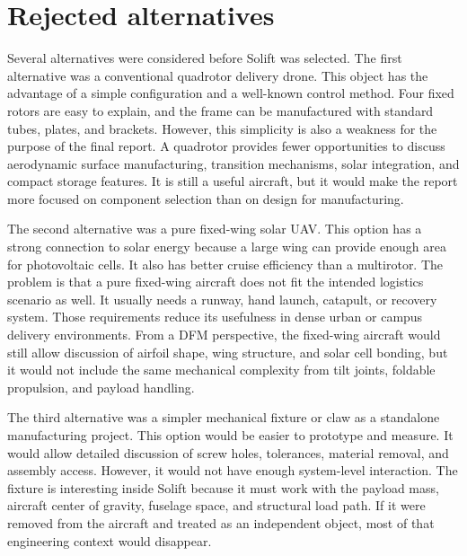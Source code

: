 \section{Rejected alternatives}
\label{subsec:rejected-alternatives}

Several alternatives were considered before Solift was selected. The first alternative was a conventional quadrotor delivery drone. This object has the advantage of a simple configuration and a well-known control method. Four fixed rotors are easy to explain, and the frame can be manufactured with standard tubes, plates, and brackets. However, this simplicity is also a weakness for the purpose of the final report. A quadrotor provides fewer opportunities to discuss aerodynamic surface manufacturing, transition mechanisms, solar integration, and compact storage features. It is still a useful aircraft, but it would make the report more focused on component selection than on design for manufacturing.

The second alternative was a pure fixed-wing solar UAV. This option has a strong connection to solar energy because a large wing can provide enough area for photovoltaic cells. It also has better cruise efficiency than a multirotor. The problem is that a pure fixed-wing aircraft does not fit the intended logistics scenario as well. It usually needs a runway, hand launch, catapult, or recovery system. Those requirements reduce its usefulness in dense urban or campus delivery environments. From a DFM perspective, the fixed-wing aircraft would still allow discussion of airfoil shape, wing structure, and solar cell bonding, but it would not include the same mechanical complexity from tilt joints, foldable propulsion, and payload handling.

The third alternative was a simpler mechanical fixture or claw as a standalone manufacturing project. This option would be easier to prototype and measure. It would allow detailed discussion of screw holes, tolerances, material removal, and assembly access. However, it would not have enough system-level interaction. The fixture is interesting inside Solift because it must work with the payload mass, aircraft center of gravity, fuselage space, and structural load path. If it were removed from the aircraft and treated as an independent object, most of that engineering context would disappear.

